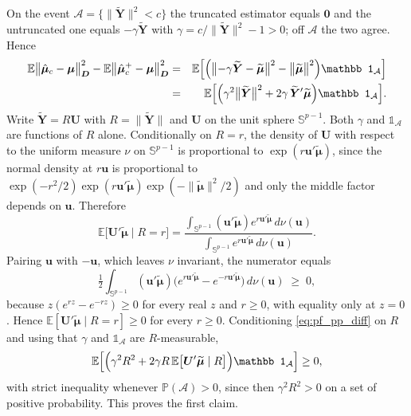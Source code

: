 \documentclass[a4paper,fleqn]{cas-sc}
\theoremstyle{plain}
\theoremstyle{definition}
\theoremstyle{remark}
\newcommand{\E}{\mathbb{E}}
\begin{document}
\begin{appendices}
On the event $\mathcal A=\{\|\widetilde{\bm Y}\|^2<c\}$ the truncated estimator equals $\bm 0$ and the untruncated one equals $-\gamma\widetilde{\bm Y}$ with $\gamma=c/\|\widetilde{\bm Y}\|^2-1>0$; off $\mathcal A$ the two agree. Hence
\begin{eqnarray}
\label{eq:pf_pp_diff}
\E\bigl\|\hat{\bm\mu}_c-\bm\mu\bigr\|^2_{\bm D}
-\E\bigl\|\hat{\bm\mu}^{+}_c-\bm\mu\bigr\|^2_{\bm D}
&=&
\E\Bigl[\Bigl(\bigl\|-\gamma\widetilde{\bm Y}-\widetilde{\bm\mu}\bigr\|^2-\bigl\|\widetilde{\bm\mu}\bigr\|^2\Bigr)\mathbb 1_{\mathcal A}\Bigr]
\cr
&=&
\E\Bigl[\Bigl(\gamma^{2}\bigl\|\widetilde{\bm Y}\bigr\|^{2}+2\gamma\,\widetilde{\bm Y}'\widetilde{\bm\mu}\Bigr)\mathbb 1_{\mathcal A}\Bigr].
\end{eqnarray}
Write $\widetilde{\bm Y}=R\bm U$ with $R=\|\widetilde{\bm Y}\|$ and $\bm U$ on the unit sphere $\mathbb S^{p-1}$. Both $\gamma$ and $\mathbb 1_{\mathcal A}$ are functions of $R$ alone. Conditionally on $R=r$, the density of $\bm U$ with respect to the uniform measure $\nu$ on $\mathbb S^{p-1}$ is proportional to $\exp(r\bm u'\widetilde{\bm\mu})$, since the normal density at $r\bm u$ is proportional to $\exp(-r^2/2)\exp(r\bm u'\widetilde{\bm\mu})\exp(-\|\widetilde{\bm\mu}\|^2/2)$ and only the middle factor depends on $\bm u$. Therefore
\begin{equation}
\E\bigl[\bm U'\widetilde{\bm\mu}\mid R=r\bigr]
=
\frac{\int_{\mathbb S^{p-1}}(\bm u'\widetilde{\bm\mu})e^{r\bm u'\widetilde{\bm\mu}}\,d\nu(\bm u)}
     {\int_{\mathbb S^{p-1}}e^{r\bm u'\widetilde{\bm\mu}}\,d\nu(\bm u)} .
\end{equation}
Pairing $\bm u$ with $-\bm u$, which leaves $\nu$ invariant, the numerator equals
\begin{equation}
\tfrac12\int_{\mathbb S^{p-1}}(\bm u'\widetilde{\bm\mu})\bigl(e^{r\bm u'\widetilde{\bm\mu}}-e^{-r\bm u'\widetilde{\bm\mu}}\bigr)\,d\nu(\bm u)
\;\ge\;0,
\end{equation}
because $z(e^{rz}-e^{-rz})\ge0$ for every real $z$ and $r\ge0$, with equality only at $z=0$. Hence $\E[\bm U'\widetilde{\bm\mu}\mid R=r]\ge0$ for every $r\ge0$. Conditioning \eqref{eq:pf_pp_diff} on $R$ and using that $\gamma$ and $\mathbb 1_{\mathcal A}$ are $R$-measurable,
\begin{equation}
\E\Bigl[\Bigl(\gamma^{2}R^{2}+2\gamma R\,\E\bigl[\bm U'\widetilde{\bm\mu}\mid R\bigr]\Bigr)\mathbb 1_{\mathcal A}\Bigr]\ge0 ,
\end{equation}
with strict inequality whenever $\mathbb P(\mathcal A)>0$, since then $\gamma^2R^2>0$ on a set of positive probability. This proves the first claim.


\end{appendices}
\end{document}
